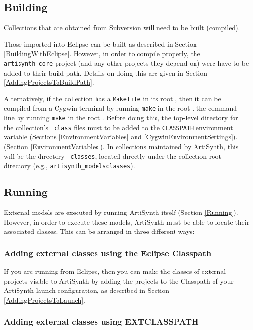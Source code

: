 \subsection{Building}

Collections that are obtained from Subversion will need to be built
(compiled).

Those imported into Eclipse can be built as described in Section
\ref{BuildingWithEclipse}. However, in order to compile properly, the
{\tt artisynth\_core} project (and any other projects they depend on)
were have to be added to their build path. Details on doing this are
given in Section \ref{AddingProjectsToBuildPath}.

Alternatively, if the collection has a {\tt Makefile} in its root
\directory, then it can be compiled from
\ifWindows
a Cygwin terminal by running {\tt make} in the root \directory. 
\else
the command line by running {\tt make} in the root \directory.
\fi
Before doing this, the top-level directory for the collection's {\tt
class} files must to be added to the {\tt CLASSPATH} environment
variable
\ifWindows
(Sections \ref{EnvironmentVariables} and \ref{CygwinEnvironmentSettings}).
\else
(Section \ref{EnvironmentVariables}).
\fi
In collections maintained by ArtiSynth, this will be the directory {\tt
classes}, located directly under the collection root directory (e.g.,
{\tt artisynth\_models\SEP classes}).

\subsection{Running}

External models are executed by running ArtiSynth itself (Section
\ref{Running}). However, in order to execute these models, ArtiSynth
must be able to locate their associated classes. This can be
arranged in three different ways:

\subsubsection{Adding external classes using the Eclipse Classpath}

If you are running from Eclipse, then you can make the classes of
external projects visible to ArtiSynth by adding the projects to the
{\sf Classpath} of your ArtiSynth launch configuration, as described
in Section \ref{AddingProjectsToLaunch}.

\subsubsection{Adding external classes using EXTCLASSPATH}

